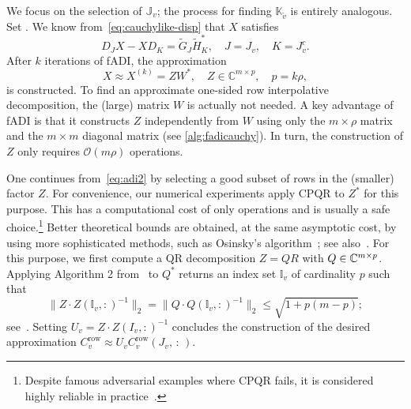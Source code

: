 We focus on the selection of $\mathbb{J}_v$; the process for finding $\mathbb{K}_{\tilde v}$ is entirely analogous.
Set .
We know from~\eqref{eq:cauchylike-disp} that $X$ satisfies \[
D_JX - XD_K = \widetilde G_J \widetilde H_K^*, \quad J = J_v, \quad K = J_v^{c}.
\]
After $k$ iterations of fADI, the approximation \begin{equation}\label{eq:adi2}
X \approx X^{(k)} = ZW^*, \quad  Z  \in \mathbb{C}^{m \times p }, \quad p = k \rho,
                                                \end{equation}
is constructed. To find an approximate one-sided row interpolative decomposition, the (large) matrix $W$ is actually not needed. A key advantage of fADI is that it constructs $Z$ independently from $W$ using only the $m \times \rho$ matrix  and the $m \times m$ diagonal matrix  (see \cref{alg:fadicauchy}). In turn, the construction of $Z$ only requires $\mathcal{O}(m \rho)$ operations.


One continues from~\eqref{eq:adi2} by selecting a good subset of rows in the (smaller) factor $Z$. For convenience, 
our numerical experiments apply CPQR to $Z^*$ for this purpose. This has a computational cost of only  operations and is usually a safe choice.\footnote{Despite famous adversarial examples where CPQR fails, it is considered highly reliable in practice~\cite{gu1996efficient}.} Better theoretical bounds are obtained, at the same asymptotic cost, by using more sophisticated methods, such as Osinsky's algorithm~\cite{Osinsky2023}; see also~\cite{Cortinovis2024}. For this purpose, we first compute a QR decomposition $Z = QR$ with $Q \in \mathbb{C}^{m\times p}$. Applying Algorithm 2 from~\cite{Osinsky2023} to $Q^*$ returns an index set
$\mathbb I_v$ of cardinality $p$ such that
\begin{equation} \label{eq:osinsky}
 \|Z \cdot Z(\mathbb I_v,:)^{-1} \|_2 = 
 \|Q \cdot Q(\mathbb I_v,:)^{-1} \|_2 \le \sqrt{1+p(m-p)};
\end{equation}
see~\cite[Thm. 5]{Osinsky2023}. Setting $U_v = Z \cdot Z(I_v,:)^{-1}$ concludes the construction of the desired
approximation $C_v^{\mathrm{row}} \approx U_v  C_v^{\mathrm{row}}({J}_v, \, :\,)$.

